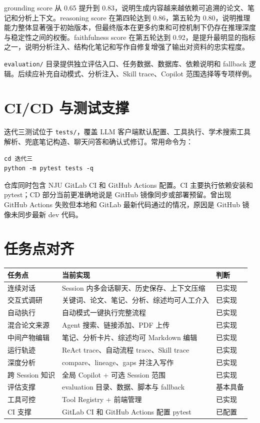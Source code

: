 \documentclass[12pt,a4paper,onecolumn]{ctexart}
\newcommand{\code}[1]{\texttt{#1}}
\begin{document}
grounding score 从 0.65 提升到 0.83，说明生成内容越来越依赖可追溯的论文、笔记和分析上下文。reasoning score 在第四轮达到 0.86，第五轮为 0.80，说明推理能力整体显著强于初始版本，但最终版本在更多约束和可控机制下仍存在推理深度与稳定性之间的权衡。faithfulness score 在第五轮达到 0.92，是提升最明显的指标之一，说明分析注入、结构化笔记和写作自修复增强了输出对资料的忠实程度。

\code{evaluation/} 目录提供独立评估入口、任务数据、数据库、依赖说明和 fallback 逻辑。后续应补充自动模式、分析注入、Skill trace、Copilot 范围选择等专项样例。

\section{CI/CD 与测试支撑}

迭代三测试位于 \code{tests/}，覆盖 LLM 客户端默认配置、工具执行、学术搜索工具解析、兜底笔记构造、聊天问答和确认式修订。常用命令为：

\begin{verbatim}
cd 迭代三
python -m pytest tests -q
\end{verbatim}

仓库同时包含 NJU GitLab CI 和 GitHub Actions 配置。CI 主要执行依赖安装和 pytest；CD 部分当前更准确地说是 GitHub 镜像同步或部署预留。曾出现 GitHub Actions 失败但本地和 GitLab 最新代码通过的情况，原因是 GitHub 镜像未同步最新 dev 代码。

\section{任务点对齐}

\begin{longtable}{p{3.4cm}p{7.0cm}p{2.6cm}}
\toprule
\textbf{任务点} & \textbf{当前实现} & \textbf{判断} \\
\midrule
连续对话 & Session 内多会话聊天、历史保存、上下文压缩 & 已实现 \\
交互式调研 & 关键词、论文、笔记、分析、综述均可人工介入 & 已实现 \\
自动执行 & 自动模式一键执行完整流程 & 已实现 \\
混合论文来源 & Agent 搜索、链接添加、PDF 上传 & 已实现 \\
中间产物编辑 & 笔记、分析卡片、综述均可 Markdown 编辑 & 已实现 \\
运行轨迹 & ReAct trace、自动流程 trace、Skill trace & 已实现 \\
深度分析 & compare、lineage、gaps 并注入写作 & 已实现 \\
跨 Session 知识 & 全局 Copilot + 可选 Session 范围 & 已实现 \\
评估支撑 & evaluation 目录、数据、脚本与 fallback & 基本具备 \\
工具可控 & Tool Registry + 前端管理 & 已实现 \\
CI 支撑 & GitLab CI 和 GitHub Actions 配置 pytest & 已配置 \\
\bottomrule
\end{longtable}
\end{document}
